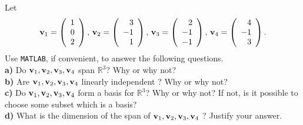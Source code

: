 \documentclass[11pt]{amsart}
\theoremstyle{definition}  %
\begin{document}
 Let 
$$  {\bf v}_1 = \left( \begin{array}{r} 1 \\ 0 \\ 2  \end{array} \right), \,  {\bf v}_2 = \left( \begin{array}{r} 3 \\ -1 \\ 1  \end{array} \right), \,
{\bf v}_3 = \left( \begin{array}{r} 2 \\ -1 \\ -1  \end{array} \right), \,    {\bf v}_4 = \left( \begin{array}{r} 4 \\ -1\\ 3  \end{array} \right).$$
Use {\tt MATLAB}, if convenient, to answer the following questions. \\
{\bf a)}  Do ${\bf v}_1, {\bf v}_2, {\bf v}_3, {\bf v}_4$ span $\mathbb{R}^3$? Why or why not? \\ 
{\bf b)}  Are ${\bf v}_1, {\bf v}_2, {\bf v}_3, {\bf v}_4$ linearly independent ? Why or why not? \\ 
{\bf c)}  Do ${\bf v}_1, {\bf v}_2, {\bf v}_3, {\bf v}_4$ form a basis for  $\mathbb{R}^3$? Why or why not? If not, is it possible to choose some
subset which is a basis? \\ 
{\bf d)}  What is the dimension of the span of ${\bf v}_1, {\bf v}_2, {\bf v}_3, {\bf v}_4$ ? Justify your answer. \\
\end{document}

